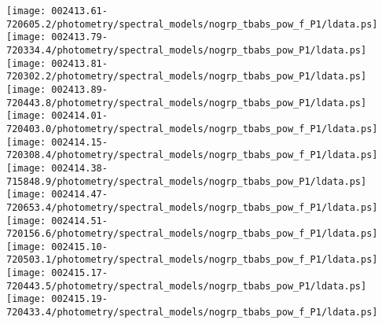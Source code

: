 \documentclass{aastex}
\begin{document}
\begin{figure*}[!ht]
\centering
\texttt{[image: 002413.61-720605.2/photometry/spectral\_models/nogrp\_tbabs\_pow\_f\_P1/ldata.ps]} \hfill 
\texttt{[image: 002413.79-720334.4/photometry/spectral\_models/nogrp\_tbabs\_pow\_P1/ldata.ps]} \hfill 
\texttt{[image: 002413.81-720302.2/photometry/spectral\_models/nogrp\_tbabs\_pow\_P1/ldata.ps]} \\ 
\vspace*{0.5in}
\texttt{[image: 002413.89-720443.8/photometry/spectral\_models/nogrp\_tbabs\_pow\_P1/ldata.ps]} \hfill 
\texttt{[image: 002414.01-720403.0/photometry/spectral\_models/nogrp\_tbabs\_pow\_f\_P1/ldata.ps]} \hfill 
\texttt{[image: 002414.15-720308.4/photometry/spectral\_models/nogrp\_tbabs\_pow\_f\_P1/ldata.ps]} \\ 
\vspace*{0.5in}
\texttt{[image: 002414.38-715848.9/photometry/spectral\_models/nogrp\_tbabs\_pow\_P1/ldata.ps]} \hfill 
\texttt{[image: 002414.47-720653.4/photometry/spectral\_models/nogrp\_tbabs\_pow\_f\_P1/ldata.ps]} \hfill 
\texttt{[image: 002414.51-720156.6/photometry/spectral\_models/nogrp\_tbabs\_pow\_f\_P1/ldata.ps]} \\ 
\vspace*{0.5in}
\texttt{[image: 002415.10-720503.1/photometry/spectral\_models/nogrp\_tbabs\_pow\_f\_P1/ldata.ps]} \hfill 
\texttt{[image: 002415.17-720443.5/photometry/spectral\_models/nogrp\_tbabs\_pow\_P1/ldata.ps]} \hfill 
\texttt{[image: 002415.19-720433.4/photometry/spectral\_models/nogrp\_tbabs\_pow\_f\_P1/ldata.ps]} \\ 
\vspace*{0.5in}
\end{figure*}
\clearpage
\end{document}
